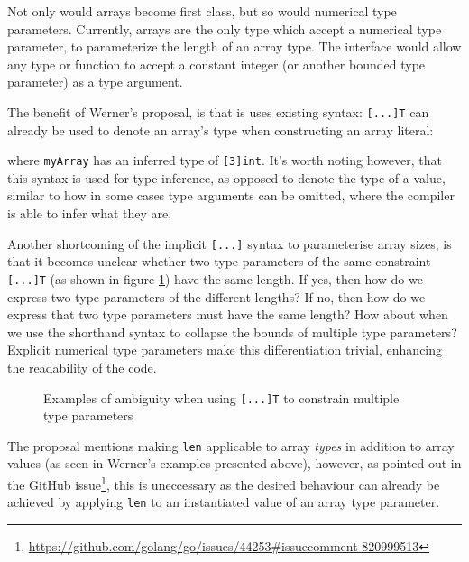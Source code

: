 Not only would arrays become first class, but so would numerical type
parameters. Currently, arrays are the only type which accept a numerical type
parameter, to parameterize the length of an array type. The  interface
would allow any type or function to accept a constant integer (or another
 bounded type parameter) as a type argument.

The benefit of Werner's proposal, is that is uses existing syntax:
\texttt{[...]T} can already be used to denote an array's type when constructing
an array literal:


where \texttt{myArray} has an inferred type of \texttt{[3]int}. It's worth
noting however, that this syntax is used for type inference, as opposed to
denote the type of a value, similar to how in some cases type arguments can be
omitted, where the compiler is able to infer what they are.


Another shortcoming of the implicit \texttt{[...]} syntax to parameterise array
sizes, is that it becomes unclear whether two type parameters of the same
constraint \texttt{[...]T} (as shown in figure \ref{fig:werner-ambiguity}) have
the same length. If yes, then how do we express two type parameters of the
different lengths? If no, then how do we express that two type parameters must
have the same length? How about when we use the shorthand syntax to collapse the
bounds of multiple type parameters? Explicit numerical type parameters make this
differentiation trivial, enhancing the readability of the code.

\begin{figure}
    \caption{Examples of ambiguity when using \texttt{[...]T} to constrain
        multiple type parameters}
    \label{fig:werner-ambiguity}
\end{figure}

The proposal mentions making \texttt{len} applicable to array \emph{types} in
addition to array values (as seen in Werner's examples presented above),
however, as pointed out in the GitHub
issue\footnote{\url{https://github.com/golang/go/issues/44253\#issuecomment-820999513}},
this is uneccessary as the desired behaviour can already be achieved by applying
\texttt{len} to an instantiated value of an array type parameter.

